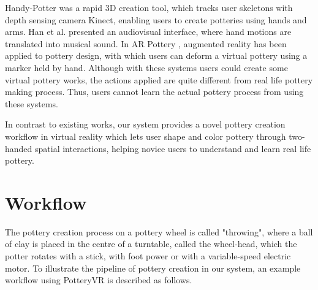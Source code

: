 Handy-Potter \cite{murugappan2013handy} was a rapid 3D creation tool, which tracks user skeletons with depth sensing camera Kinect, enabling users to create potteries using hands and arms.
Han et al. \cite{han2014virtual} presented an audiovisual interface, where hand motions are translated into musical sound.
In AR Pottery \cite{han2007ar}, augmented reality has been applied to pottery design, with which users can deform a virtual pottery using a marker held by hand.
Although with these systems users could create some virtual pottery works, the actions applied are quite different from real life pottery making process. Thus, users cannot learn the actual pottery process from using these systems.

In contrast to existing works, our system provides a novel pottery creation workflow in virtual reality which lets user shape and color pottery through two-handed spatial interactions, helping novice users to understand and learn real life pottery.



\section{Workflow}
\label{sec:3}

The pottery creation process on a pottery wheel is called "throwing", where a ball of clay is placed in the centre of a turntable, called the wheel-head, which the potter rotates with a stick, with foot power or with a variable-speed electric motor.
To illustrate the pipeline of pottery creation in our system, an example workflow using PotteryVR is described as follows.


